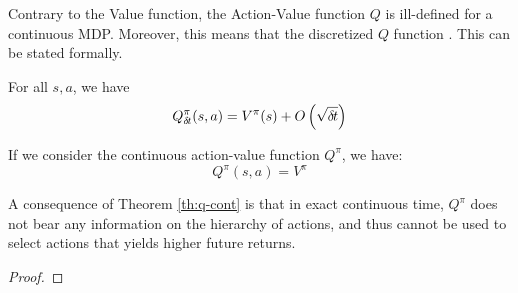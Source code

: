 Contrary to the Value function, the Action-Value function $Q$ is ill-defined for a continuous MDP. Moreover, this means that the discretized $Q$ function . This can be stated formally.
\begin{theorem}
  For all $s, a$, we have
  \begin{equation}
    \label{eq:q-discr}
    Q^\pi_{\delta\hspace{-.1em}t}(s, a) = V^\pi(s) + O\left(\sqrt{{\delta\hspace{-.1em}t}}\right)
  \end{equation}
  
  If we consider the continuous action-value function $Q^\pi$, we have:
  \begin{equation}
    \label{eq:q-cont}
    Q^\pi(s, a) = V^\pi
  \end{equation}
  \label{th:q-cont}
\end{theorem}

A consequence of Theorem \ref{th:q-cont} is that in exact continuous time,
$Q^\pi$ does not bear any information on the hierarchy of actions, and
thus cannot be used to select actions that yields higher future returns.

\begin{proof}
  \end{proof}
